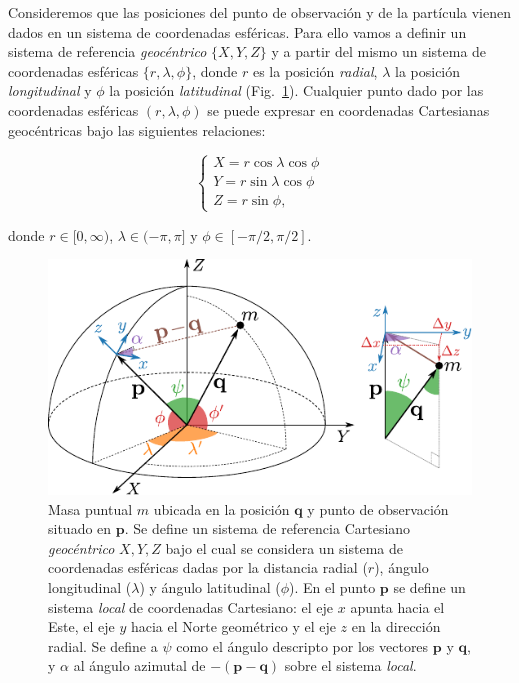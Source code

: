 Consideremos que las posiciones del punto de observación y de la partícula
vienen dados en un sistema de coordenadas esféricas. Para ello vamos a definir
un sistema de referencia \emph{geocéntrico} $\{X, Y, Z\}$ y a partir del mismo
un sistema de coordenadas esféricas $\{r, \lambda, \phi\}$, donde $r$ es la
posición \emph{radial}, $\lambda$ la posición \emph{longitudinal} y $\phi$ la
posición \emph{latitudinal} (Fig.~\ref{fig:spherical-coordinates}).
Cualquier punto dado por las coordenadas esféricas $(r, \lambda, \phi)$ se
puede expresar en coordenadas Cartesianas geocéntricas bajo las siguientes
relaciones:

\begin{equation}
    \begin{cases}
        X = r \cos\lambda \cos{\phi} \\
        Y = r \sin\lambda \cos{\phi} \\
        Z = r \sin{\phi},
    \end{cases}
\end{equation}

\noindent donde $r \in [0, \infty)$, $\lambda \in (-\pi, \pi]$ y
$\phi \in [-\pi/2, \pi/2]$.

\begin{figure}
    \centering
    \includegraphics[width=\linewidth]{figs/spherical-coordinates.pdf}
    \caption{
        Masa puntual $m$ ubicada en la posición $\mathbf{q}$ y punto de
        observación situado en $\mathbf{p}$.
        Se define un sistema de referencia Cartesiano \emph{geocéntrico} $X, Y,
        Z$ bajo el cual se considera un sistema de coordenadas esféricas dadas
        por la distancia radial ($r$), ángulo longitudinal ($\lambda$) y ángulo
        latitudinal ($\phi$).
        En el punto $\mathbf{p}$ se define un sistema \emph{local} de
        coordenadas Cartesiano: el eje $x$ apunta hacia el Este,
        el eje $y$ hacia el Norte geométrico y el eje $z$ en la dirección
        radial.
        Se define a $\psi$ como el ángulo descripto por los vectores
        $\mathbf{p}$ y $\mathbf{q}$, y $\alpha$ al ángulo azimutal de
        $-(\mathbf{p} - \mathbf{q})$ sobre el sistema \emph{local}.
    }
    \label{fig:spherical-coordinates}
\end{figure}

